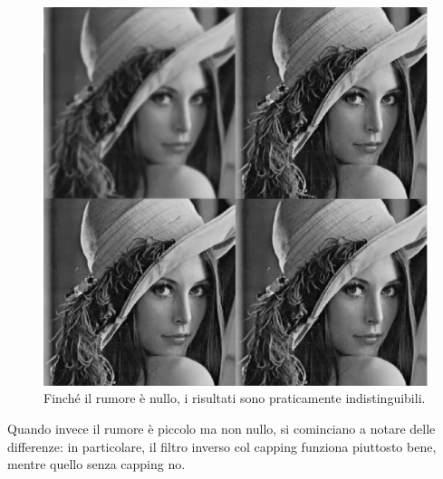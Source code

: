 \documentclass[a4paper,11pt]{article}
\begin{document}
\renewcommand{\thefigure}{8.11}
\begin{figure}[!h]
  \centering
    \includegraphics[scale=0.5]{images/8/lena_inversion_without_noise.png}
    \caption{Finché il rumore è nullo, i risultati sono praticamente indistinguibili.}
\end{figure}

\newpage
Quando invece il rumore è piccolo ma non nullo, si cominciano a notare delle differenze: in particolare, il filtro inverso col capping funziona
piuttosto bene, mentre quello senza capping no.
\end{document}
